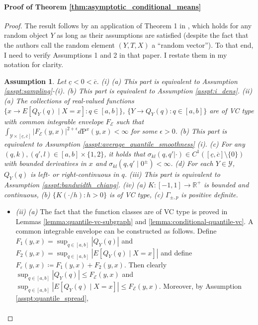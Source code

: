 \documentclass[12pt]{article}
\newtheorem{assumption}{Assumption}
\begin{document}
\paragraph{Proof of Theorem \ref{thm:asymptotic_conditional_means}}
\begin{proof} 
The result follows by an application of Theorem 1 in \citet{chiang2019robust}, which holds for any random object $Y$ as long as their assumptions are satisfied (despite the fact that the authors call the random element $(Y,T,X)$ a ``random vector''). To that end, I need to verify Assumptions 1 and 2 in that paper. I restate them in my notation for clarity.
{
\renewcommand{\theassumption}{1, \citealp{chiang2019robust}}
\begin{assumption} \label{asspt1_chiang}
Let $\underline{c} < 0 < \overline{c}$. (i) (a) This part is equivalent to Assumption \ref{asspt:sampling}-(i). (b) This part is equivalent to Assumption \ref{asspt:i_dens}. (ii) (a) The collections of real-valued functions $\{ x \to E[Q_Y(q) \mid X=x] : q \in [a,b] \}$, $ \{ Y \to Q_Y(q) : q \in [a,b] \}$ are of VC type with common integrable envelope $F_\mathcal{E}$ such that $\int_{\mathcal{Y} \times [\underline{c}, \overline{c}] }\left|F_{\mathcal{E}}(y, x)\right|^{2+\epsilon} d \mathrm{P}^x(y, x)<\infty$ for some $\epsilon>0$. (b) This part is equivalent to Assumption \ref{asspt:average_quantile_smoothness} (i). (c) For any $(q,k), (q',l) \in [a,b] \times \{1,2\}$, it holds that $\sigma_{kl}(q,q' | \cdot) \in C^{1}([\underline{c}, \overline{c}] \setminus \{0\} )$ with bounded derivatives in $x$ and $\sigma_{kl}(q,q' \mid 0^{\pm}) < \infty$. (d) For each $Y \in \mathcal{Y}$, $Q_Y(q)$ is left- or right-continuous in $q$. (iii) This part is equivalent to Assumption \ref{asspt:bandwidth_chiang}. (iv) (a) $K: [-1,1] \to \mathbb{R}^+$ is bounded and continuous, (b) $\{ K(\cdot / h) : h > 0 \}$ is of VC type, (c) $\Gamma_{\pm, p}$ is positive definite. 
\end{assumption}
}
\begin{itemize}
\item \textit{(ii) (a)} The fact that the function classes are of VC type is proved in Lemmas \ref{lemma:quantile-vc-subgraph} and \ref{lemma:conditional-quantile-vc}. A common integrable envelope can be constructed as follows. Define $F_{1}(y,x) = \sup_{q \in [a,b]} |Q_Y(q)|$ and $F_2(y,x) = \sup_{q \in [a,b]} |E[Q_Y(q) \mid X=x]|$ and define $F_{\varepsilon}(y,x) \coloneqq F_1(y,x) + F_2(y,x)$. Then clearly $\sup_{q \in [a,b]} |Q_Y(q)| \leq F_{\mathcal{E}}(y,x)$ and $\sup_{q \in [a,b]} |E[Q_Y(q) \mid X=x]| \leq F_{\mathcal{E}}(y,x)$. Moreover, by Assumption \ref{asspt:quantile_spread}, \begin{align*}

\end{align*}
\end{itemize}
\end{proof}
\end{document}
